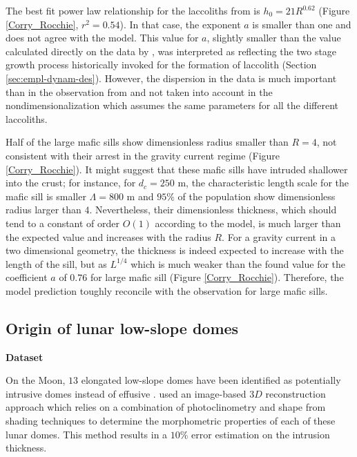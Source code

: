 The  best  fit   power  law  relationship  for   the  laccoliths  from
\citet{E:2015tl} is  $h_0 = 21 R^{0.62}$  (Figure \ref{Corry_Rocchie},
$r^2 =0.54$). In  that case, the exponent $a$ is  smaller than one and
does not agree  with the model.  This value for  $a$, slightly smaller
than    the   value    calculated    directly   on    the   data    by
\citep{McCaffrey:1997ea}, was interpreted as  reflecting the two stage
growth  process historically  invoked for  the formation  of laccolith
(Section  \ref{sec:empl-dynam-des}). However,  the  dispersion in  the
data   is    much   important    than   in   the    observation   from
\citet{Rocchi:2010dn}   and   not   taken    into   account   in   the
nondimensionalization which  assumes the  same parameters for  all the
different laccoliths.

Half of the  large mafic sills show dimensionless  radius smaller than
$R=4$, not consistent with their  arrest in the gravity current regime
(Figure \ref{Corry_Rocchie}).  It might suggest that these mafic sills
have intruded shallower into the crust; for instance, for $d_c=250$ m,
the  characteristic  length  scale  for  the  mafic  sill  is  smaller
$\Lambda=800$ m and $95\%$ of the population show dimensionless radius
larger than  $4$. Nevertheless,  their dimensionless  thickness, which
should tend to  a constant of order $O(1)$ according  to the model, is
much larger than the expected value and increases with the radius $R$.
For a gravity current in a  two dimensional geometry, the thickness is
indeed  expected to  increase  with the  length of  the  sill, but  as
$L^{1/4}$ \citet{Michaut:2011kg}  which is much weaker  than the found
value for the  coefficient $a$ of $0.76$ for large  mafic sill (Figure
\ref{Corry_Rocchie}).    Therefore,  the   model  prediction   toughly
reconcile with the observation for large mafic sills.


\subsection{Origin of lunar low-slope domes}
\label{sec:observ-vs-pred}

\vspace{.5cm}\hspace{.5cm} \textbf{Dataset} \vspace{.5cm}

On the  Moon, $13$ elongated  low-slope domes have been  identified as
potentially      intrusive     domes      instead     of      effusive
\citep{Wohler:2007it,Wohler:2009jj}.   \citet{Wohler:2009jj}  used  an
image-based $3D$ reconstruction approach which relies on a combination
of photoclinometry and shape from  shading techniques to determine the
morphometric  properties of  each of  these lunar  domes. This  method
results in a $10\%$ error estimation on the intrusion thickness.




